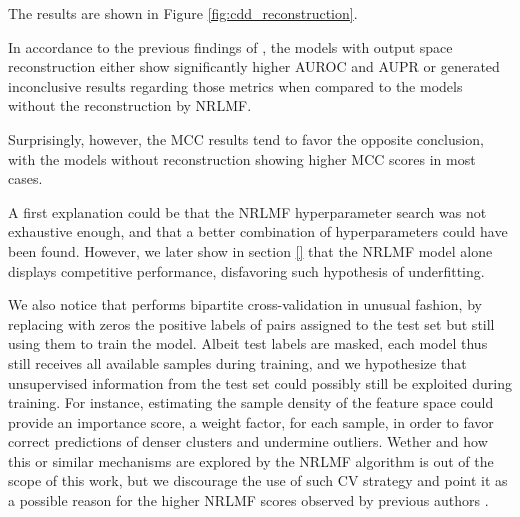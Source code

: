 The results are shown in Figure \ref{fig:cdd_reconstruction}.

In accordance to the previous findings of \cite{Pliakos_2020}, the models with output space reconstruction either show significantly higher AUROC and AUPR or generated inconclusive results regarding those metrics when compared to the models without the reconstruction by NRLMF.

Surprisingly, however, the MCC results tend to favor the opposite conclusion, with the models without reconstruction showing higher MCC scores in most cases.


A first explanation could be that the NRLMF hyperparameter search was not exhaustive enough, and that a better combination of hyperparameters could have been found. However, we later show in section \ref{} that the NRLMF model alone displays competitive performance, disfavoring such hypothesis of underfitting.

We also notice that \cite{Liu_2017} performs bipartite cross-validation in unusual fashion, by replacing with zeros the positive labels of pairs assigned to the test set but still using them to train the model. Albeit test labels are masked, each model thus still receives all available samples during training, and we hypothesize that unsupervised information from the test set could possibly still be exploited during training. For instance, estimating the sample density of the feature space could provide an importance score, a weight factor, for each sample, in order to favor correct predictions of denser clusters and undermine outliers. Wether and how this or similar mechanisms are explored by the NRLMF algorithm is out of the scope of this work, but we discourage the use of such CV strategy and point it as a possible reason for the higher NRLMF scores observed by previous authors \cite{Pliakos_2020;Liu_2017}.


